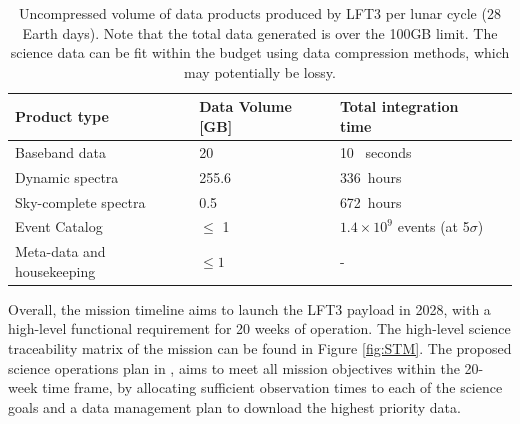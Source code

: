 \begin{table}
    \centering
    \caption{Uncompressed volume of data products produced by LFT3 per lunar cycle (28 Earth days). Note that the total data generated is over the 100GB limit. The science data can be fit within the budget using data compression methods, which may potentially be lossy.}
    \begin{tabular}{|l|l|l|l|} \hline
    \textbf{Product type} & \textbf{Data Volume [GB]} & \textbf{Total integration time} \\ \hline
    Baseband data        & 20 &  10 \, seconds \\ \hline
    Dynamic spectra      & 255.6 & 336\, hours  \\ \hline
    Sky-complete spectra & 0.5 & 672\, hours \\  \hline
    Event Catalog        & $\le$ 1 & $1.4\times 10^9$ events (at 5$\sigma$) \\ \hline
    Meta-data and housekeeping & $\le 1$ & - \\ \hline
    \end{tabular}
    \label{tab:data}
\end{table}

Overall, the mission timeline aims to launch the LFT3 payload in 2028, with a high-level functional requirement for 20 weeks of operation. The high-level science traceability matrix of the mission can be found in Figure \ref{fig:STM}. The proposed science operations plan in \cite{prabu2025lft3}, aims to meet all mission objectives within the 20-week time frame, by allocating sufficient observation times to each of the science goals and a data management plan to download the highest priority data.
